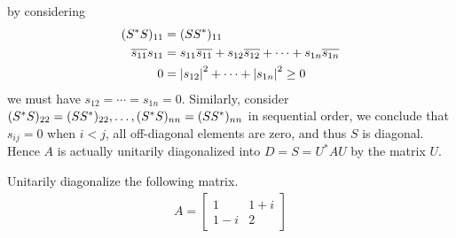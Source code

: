 by considering
\begin{align*}
(S^*S)_{11} &= (SS^*)_{11} \\
\overline{s_{11}}s_{11} &= s_{11}\overline{s_{11}} + s_{12}\overline{s_{12}} + \cdots + s_{1n}\overline{s_{1n}} \\
0 &= \abs{s_{12}}^2 + \cdots + \abs{s_{1n}}^2 \geq 0
\end{align*}
we must have $s_{12} = \cdots = s_{1n} = 0$. Similarly, consider $(S^*S)_{22} = (SS^*)_{22}, \ldots, \\ (S^*S)_{nn} = (SS^*)_{nn}$ in sequential order, we conclude that $s_{ij} = 0$ when $i < j$, all off-diagonal elements are zero, and thus $S$ is diagonal. Hence $A$ is actually unitarily diagonalized into $D = S = U^*AU$ by the matrix $U$.

\begin{exmp}
Unitarily diagonalize the following matrix.
\begin{align*}
A =
\begin{bmatrix}
1 & 1+i \\
1-i & 2
\end{bmatrix}
\end{align*}
\end{exmp}
